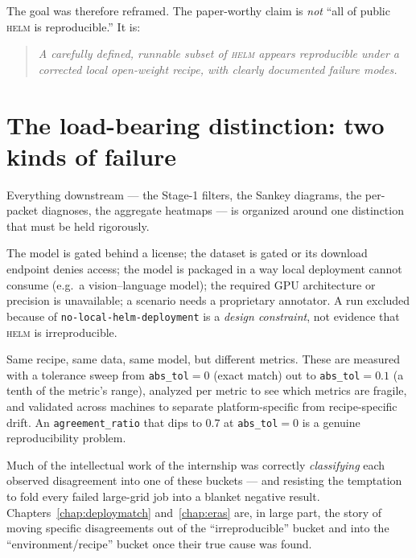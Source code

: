 \documentclass[11pt]{report}
\newcommand{\code}[1]{\texttt{#1}}
\begin{document}
The goal was therefore reframed. The paper-worthy claim is \emph{not} ``all of
public \textsc{helm} is reproducible.'' It is:

\begin{quote}\itshape
A carefully defined, runnable subset of \textsc{helm} appears reproducible under a
corrected local open-weight recipe, with clearly documented failure modes.
\end{quote}

\section{The load-bearing distinction: two kinds of failure}
\label{sec:distinction}

Everything downstream --- the Stage-1 filters, the Sankey diagrams, the
per-packet diagnoses, the aggregate heatmaps --- is organized around one
distinction that must be held rigorously.

\begin{description}[style=nextline,leftmargin=1.5em]
  \item[Recipe / environment failures (these are \emph{filtering reasons}, not
        reproducibility results).] The model is gated behind a license; the dataset
        is gated or its download endpoint denies access; the model is packaged in a
        way local deployment cannot consume (e.g.\ a vision--language model); the
        required GPU architecture or precision is unavailable; a scenario needs a
        proprietary annotator. A run excluded because of
        \code{no-local-helm-deployment} is a \emph{design constraint}, not evidence
        that \textsc{helm} is irreproducible.
  \item[True reproducibility failures.] Same recipe, same data, same model, but
        different metrics. These are measured with a tolerance sweep from
        \code{abs\_tol}$=0$ (exact match) out to \code{abs\_tol}$=0.1$ (a tenth of
        the metric's range), analyzed per metric to see which metrics are fragile,
        and validated across machines to separate platform-specific from
        recipe-specific drift. An \code{agreement\_ratio} that dips to $0.7$ at
        \code{abs\_tol}$=0$ is a genuine reproducibility problem.
\end{description}

Much of the intellectual work of the internship was correctly \emph{classifying}
each observed disagreement into one of these buckets --- and resisting the
temptation to fold every failed large-grid job into a blanket negative result.
Chapters~\ref{chap:deploymatch} and~\ref{chap:eras} are, in large part, the story
of moving specific disagreements out of the ``irreproducible'' bucket and into the
``environment/recipe'' bucket once their true cause was found.
\end{document}
